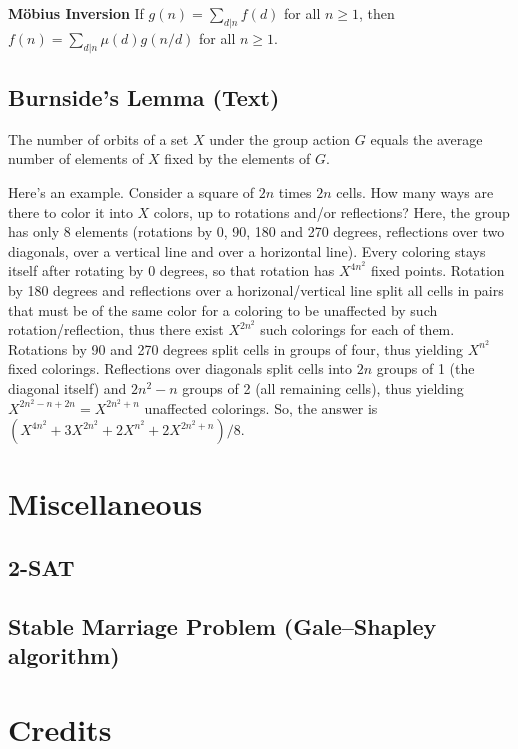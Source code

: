 \documentclass[12pt]{extarticle}
\begin{document}
\begin{multicols*}{2}
\textbf{M\"obius Inversion}
If $g(n) = \sum_{d|n} f(d)$ for all $n \ge 1$, then
$f(n) = \sum_{d|n} \mu(d)g(n/d)$ for all $n \ge 1$.


\subsection{Burnside's Lemma (Text)} %
The number of orbits of a set $X$ under the group action $G$ equals the average
number of elements of $X$ fixed by the elements of $G$.

Here's an example. Consider a square of $2n$ times $2n$ cells. How many ways
are there to color it into $X$ colors, up to rotations and/or reflections?
Here, the group has only 8 elements (rotations by 0, 90, 180 and 270 degrees,
reflections over two diagonals, over a vertical line and over a horizontal
line). Every coloring stays itself after rotating by 0 degrees, so that
rotation has $X^{4n^2}$ fixed points. Rotation by 180 degrees and reflections
over a horizonal/vertical line split all cells in pairs that must be of the
same color for a coloring to be unaffected by such rotation/reflection, thus
there exist $X^{2n^2}$ such colorings for each of them. Rotations by 90 and 270
degrees split cells in groups of four, thus yielding $X^{n^2}$ fixed colorings.
Reflections over diagonals split cells into $2n$ groups of 1 (the diagonal
itself) and $2n^2-n$ groups of 2 (all remaining cells), thus yielding
$X^{2n^2-n+2n}=X^{2n^2+n}$ unaffected colorings.  So, the answer is
$(X^{4n^2}+3X^{2n^2}+2X^{n^2}+2X^{2n^2+n})/8$.

\section{Miscellaneous}
\subsection{2-SAT} %


\subsection{Stable Marriage Problem (Gale--Shapley algorithm)} %



\section{Credits}


\end{multicols*}
\end{document}
